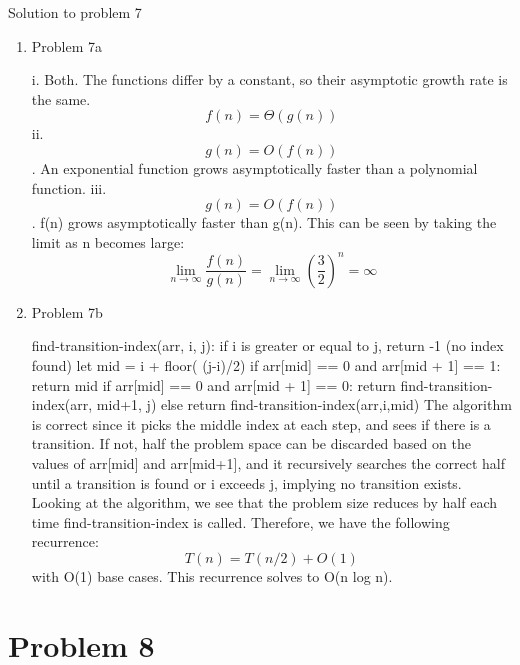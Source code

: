 \documentclass[11pt]{article}
\newcommand{\solution}[1]{{{\color{blue}{\bf Solution:} {#1}}}}
\begin{document}
\solution{Solution to problem 7}
\begin{enumerate}
\item Problem 7a

\solution{
i. Both. The functions differ by a constant, so their asymptotic growth rate is the same. \[ f(n) = \Theta(g(n)) \]
ii. \[g(n) = O(f(n)) \]. An exponential function grows asymptotically faster than a polynomial function.
\newline
iii. \[g(n) = O(f(n)) \]. f(n) grows asymptotically faster than g(n). This can be seen by taking the limit as n becomes large:
\[\lim_{n\to\infty} \frac{f(n)}{g(n)} = \lim_{n\to\infty} (\frac{3}{2})^n = \infty \]
}

\vspace{0.05cm}
\item Problem 7b

\solution{\newline
find-transition-index(arr, i, j): \newline
    if i is greater or equal to j, return -1 (no index found) \newline
    let mid = i + floor( (j-i)/2) \newline
    if arr[mid] == 0 and arr[mid + 1] == 1: return mid \newline
    if arr[mid] == 0 and arr[mid + 1] == 0: return find-transition-index(arr, mid+1, j) \newline
    else return find-transition-index(arr,i,mid)
    \newline
    \newline
    The algorithm is correct since it picks the middle index at each step, and sees if there is a transition. If not, half the problem space can be discarded based on the values of arr[mid] and arr[mid+1], and it recursively searches the correct half until a transition is found or i exceeds j, implying no transition exists.
    \newline
    \newline
    Looking at the algorithm, we see that the problem size reduces by half each time find-transition-index is called. Therefore, we have the following recurrence: 
    \[ T(n) = T(n/2) + O(1) \] with O(1) base cases. This recurrence solves to O(n log n).
    
}


\end{enumerate}
\newpage

\section{Problem 8}
\end{document}
